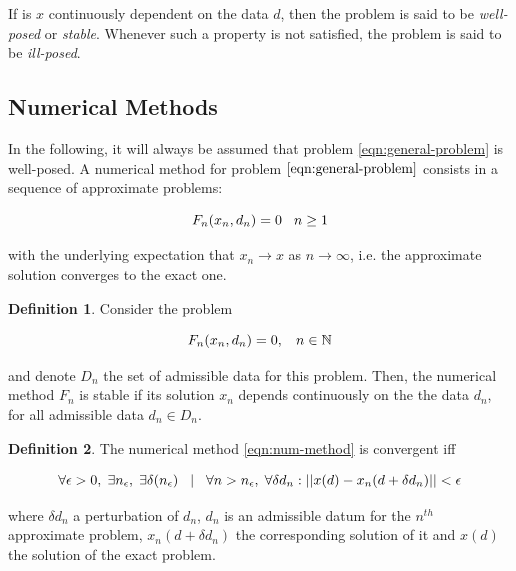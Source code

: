 \documentclass{article}
\theoremstyle{theorem}
\theoremstyle{definition}
\newtheorem{definition}{Definition}
\begin{document}
If is $x$ continuously dependent on the data $d$, then the problem is said to be \emph{well-posed} or \emph{stable}. Whenever such a property is not satisfied, the problem is said to be \emph{ill-posed}.\\

\subsection{Numerical Methods}
In the following, it will always be assumed that problem \eqref{eqn:general-problem} is well-posed. A numerical method for problem $\eqref{eqn:general-problem}$ consists in a sequence of approximate problems:

\begin{equation}
	\label{eqn:num-method}
	F_n(x_n, d_n) = 0 \hspace{3mm} n\ge 1
\end{equation}

with the underlying expectation that $x_n\rightarrow x$ as $n\rightarrow\infty$, i.e. the approximate solution converges to the exact one. 

\begin{definition}
	\label{defn:stability}
	Consider the problem 
	
	$$F_n(x_n, d_n)=0, \hspace{3mm} n\in\mathbb{N}$$
	
	and denote $D_n$ the set of admissible data for this problem. Then, the numerical method $F_n$ is stable if its solution $x_n$ depends continuously on the the data $d_n$, for all admissible data $d_n\in D_n$.
\end{definition}

\begin{definition}
	\label{defn:convergence}
The numerical method \eqref{eqn:num-method} is convergent iff

$$\forall\epsilon >0,\hspace{1mm} \exists n_\epsilon,\hspace{1mm} \exists\delta(n_\epsilon)\hspace{3mm} | \hspace{3mm}\forall n > n_\epsilon,\hspace{1mm} \forall\delta d_n : ||x(d)-x_n(d+\delta d_n)||<\epsilon$$

where $\delta d_n$ a perturbation of $d_n$, $d_n$ is an admissible datum for the $n^{th}$ approximate problem,  $x_n(d+\delta d_n)$ the corresponding solution of it and $x(d)$ the solution of the exact problem.
\end{definition}
\end{document}
